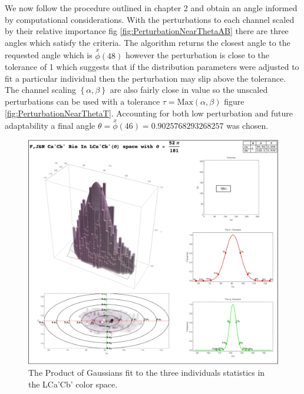 We now follow the procedure outlined in chapter 2 and obtain an angle informed by computational considerations.  
With the perturbations to each channel scaled by their relative importance fig \ref{fig:PerturbationNearThetaAB} there are three angles which satisfy the criteria.
 The algorithm returns the closest angle to the requested angle which is $\overset{x}{\phi } (48)$ however the perturbation is close to the tolerance of 1 which suggests that if the distribution parameters were adjusted to fit a particular individual then the perturbation may slip above the tolerance. 
 The channel scaling $\left\{ \alpha, \beta\right\} $ are also fairly close in value so the unscaled perturbations can be used with a tolerance $\tau = \text{Max}\left(\alpha, \beta\right)$ figure \ref{fig:PerturbationNearThetaT}. 
 Accounting for both low perturbation and future adaptability a final angle $\theta = \overset{x}{\phi }(46) = 0.9025768293268257$ was chosen.

\begin{figure}[h!]
  \centering
  \includegraphics[width=1.0 \textwidth]{Chapter3/Figs/Fit_the_Gaussian_Final.jpg} 
    \caption{The Product of Gaussians fit to the three individuals statistics in the LCa'Cb' color space.  }  \label{fig:FittheGaussianFinal}
\end{figure}

